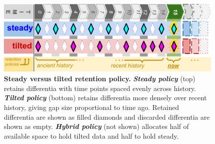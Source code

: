 \begin{figure}
  \centering
  \includegraphics[width=\linewidth]{img/steady-vs-tilted-schematic}
  \caption{%
  \textbf{Steady versus tilted retention policy.}
  \textbf{\textit{Steady policy}} (top) retains differentia with time points spaced evenly across history.
  \textbf{\textit{Tilted policy}} (bottom) retains differentia more densely over recent history, giving gap size proportional to time ago.
  Retained differentia are shown as filled diamonds and discarded differentia are shown as empty.
  \textbf{\textit{Hybrid policy}} (not shown) allocates half of available space to hold tilted data and half to hold steady.
  }
  \label{fig:steady-vs-tilted-schematic}
\end{figure}
